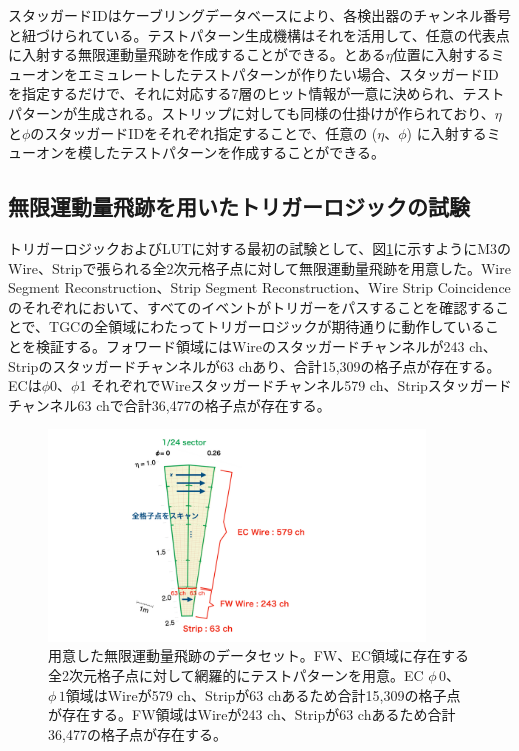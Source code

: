 
スタッガードIDはケーブリングデータベースにより、各検出器のチャンネル番号と紐づけられている。テストパターン生成機構はそれを活用して、任意の代表点に入射する無限運動量飛跡を作成することができる。とある$\eta$位置に入射するミューオンをエミュレートしたテストパターンが作りたい場合、スタッガードIDを指定するだけで、それに対応する7層のヒット情報が一意に決められ、テストパターンが生成される。ストリップに対しても同様の仕掛けが作られており、$\eta$と$\phi$のスタッガードIDをそれぞれ指定することで、任意の ($\eta$、$\phi$) に入射するミューオンを模したテストパターンを作成することができる。


\subsection{無限運動量飛跡を用いたトリガーロジックの試験}
トリガーロジックおよびLUTに対する最初の試験として、図\ref{InfMomentum}に示すようにM3のWire、Stripで張られる全2次元格子点に対して無限運動量飛跡を用意した。Wire Segment Reconstruction、Strip Segment Reconstruction、Wire Strip Coincidenceのそれぞれにおいて、すべてのイベントがトリガーをパスすることを確認することで、TGCの全領域にわたってトリガーロジックが期待通りに動作していることを検証する。フォワード領域にはWireのスタッガードチャンネルが243 ch、Stripのスタッガードチャンネルが63 chあり、合計15,309の格子点が存在する。ECは$\phi$0、$\phi$1 それぞれでWireスタッガードチャンネル579 ch、Stripスタッガードチャンネル63 chで合計36,477の格子点が存在する。

\begin{figure} 
\centering
\includegraphics[width=10cm]{fig/Test/InfMomentum.pdf}
\caption[用意した無限運動量飛跡のデータセット]{用意した無限運動量飛跡のデータセット。FW、EC領域に存在する全2次元格子点に対して網羅的にテストパターンを用意。EC $\phi\,0$、$\phi\,1$領域はWireが579 ch、Stripが63 chあるため合計15,309の格子点が存在する。FW領域はWireが243 ch、Stripが63 chあるため合計36,477の格子点が存在する。}
\label{InfMomentum}
\end{figure}


